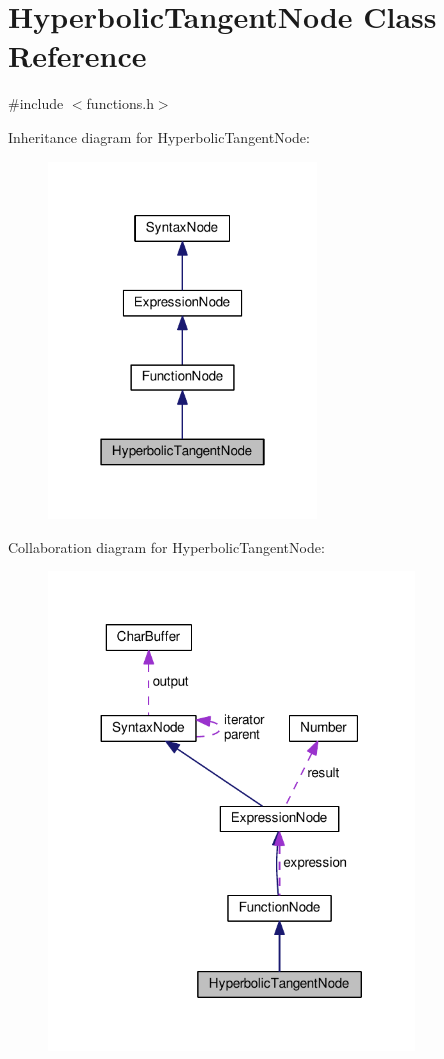 \hypertarget{classHyperbolicTangentNode}{}\section{Hyperbolic\+Tangent\+Node Class Reference}
\label{classHyperbolicTangentNode}


{\ttfamily \#include $<$functions.\+h$>$}



Inheritance diagram for Hyperbolic\+Tangent\+Node\+:
\nopagebreak
\begin{figure}[H]
\begin{center}
\leavevmode
\includegraphics[width=202pt]{d5/d3d/classHyperbolicTangentNode__inherit__graph}
\end{center}
\end{figure}


Collaboration diagram for Hyperbolic\+Tangent\+Node\+:
\nopagebreak
\begin{figure}[H]
\begin{center}
\leavevmode
\includegraphics[width=275pt]{d6/d6d/classHyperbolicTangentNode__coll__graph}
\end{center}
\end{figure}
